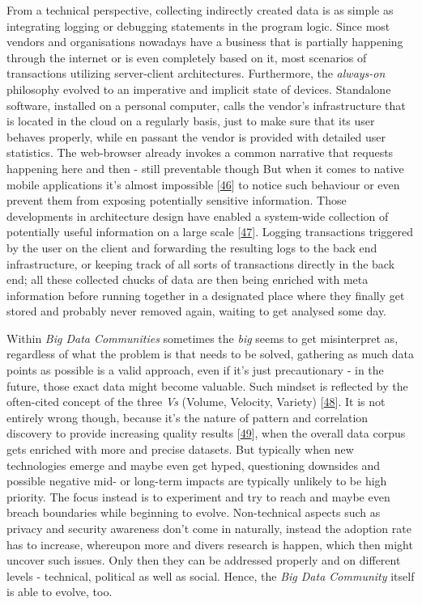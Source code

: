\documentclass[12pt,english,a4paper,titlepage,cleardoublepage=empty,dottedtoc]{report}
\begin{document}
From a technical perspective, collecting indirectly created data is as
simple as integrating logging or debugging statements in the program
logic. Since most vendors and organisations nowadays have a business
that is partially happening through the internet or is even completely
based on it, most scenarios of transactions utilizing server-client
architectures. Furthermore, the \emph{always-on} philosophy evolved to
an imperative and implicit state of devices. Standalone software,
installed on a personal computer, calls the vendor's infrastructure that
is located in the cloud on a regularly basis, just to make sure that its
user behaves properly, while en passant the vendor is provided with
detailed user statistics. The web-browser already invokes a common
narrative that requests happening here and then - still preventable
though But when it comes to native mobile applications it's almost
impossible {[}\protect\hyperlink{ref-web_2016_answers-io}{46}{]} to
notice such behaviour or even prevent them from exposing potentially
sensitive information. Those developments in architecture design have
enabled a system-wide collection of potentially useful information on a
large scale
{[}\protect\hyperlink{ref-web_2016_big-data-enthusiasts-should-not-ignore}{47}{]}.
Logging transactions triggered by the user on the client and forwarding
the resulting logs to the back end infrastructure, or keeping track of
all sorts of transactions directly in the back end; all these collected
chucks of data are then being enriched with meta information before
running together in a designated place where they finally get stored and
probably never removed again, waiting to get analysed some day.

Within \emph{Big Data Communities} sometimes the \emph{big} seems to get
misinterpret as, regardless of what the problem is that needs to be
solved, gathering as much data points as possible is a valid approach,
even if it's just precautionary - in the future, those exact data might
become valuable. Such mindset is reflected by the often-cited concept of
the three \emph{Vs} (Volume, Velocity, Variety)
{[}\protect\hyperlink{ref-report_2001_3d-data-management-controlling-data-volume-velocity-and-variety}{48}{]}.
It is not entirely wrong though, because it's the nature of pattern and
correlation discovery to provide increasing quality results
{[}\protect\hyperlink{ref-paper_2015_big-data-for-development-a-review-of-promises-and-challenges:more-data}{49}{]},
when the overall data corpus gets enriched with more and precise
datasets. But typically when new technologies emerge and maybe even get
hyped, questioning downsides and possible negative mid- or long-term
impacts are typically unlikely to be high priority. The focus instead is
to experiment and try to reach and maybe even breach boundaries while
beginning to evolve. Non-technical aspects such as privacy and security
awareness don't come in naturally, instead the adoption rate has to
increase, whereupon more and divers research is happen, which then might
uncover such issues. Only then they can be addressed properly and on
different levels - technical, political as well as social. Hence, the
\emph{Big Data Community} itself is able to evolve, too.
\end{document}
